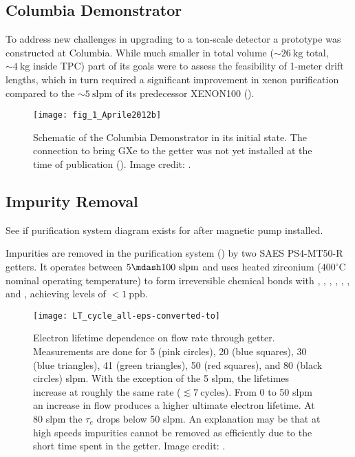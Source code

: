 \subsection{Columbia Demonstrator}
\label{subsec:electron_lifetime_model_demonstrator}
To address new challenges in upgrading to a ton-scale detector a prototype was constructed at Columbia.  While much smaller in total
volume (${\sim}26\ \mathrm{kg}$ total, ${\sim}4\ \mathrm{kg}$ inside TPC) part of its goals were to assess the feasibility of 1-meter
drift lengths, which in turn required a significant improvement in xenon purification compared to the ${\sim}5\ \mathrm{slpm}$ of its
predecessor XENON100 ().

\begin{figure}
\centering
\texttt{[image: fig\_1\_Aprile2012b]}
\caption{Schematic of the Columbia Demonstrator in its initial state.  The connection to bring GXe to the getter was not yet installed
at the time of publication ().  Image credit: .}
\label{fig:electron_lifetime_model_demonstrator_schematic}
\end{figure}



\subsection{Impurity Removal}
\label{subsec:electron_lifetime_model_removal}
See if purification system diagram exists for after magnetic pump installed.

Impurities are removed in the purification system () by two SAES PS4-MT50-R getters.  It operates between
$5 \mdash 100\ \mathrm{slpm}$ and uses heated zirconium ($400^{\circ}\mathrm{C}$ nominal operating temperature) to form irreversible
chemical bonds with , , , , , , and , achieving levels of
$< 1\ \mathrm{ppb}$.

\begin{figure}
\centering
\texttt{[image: LT\_cycle\_all-eps-converted-to]}
\caption{Electron lifetime dependence on flow rate through getter.  Measurements are done for 5 (pink circles), 20 (blue squares), 30
(blue
triangles), 41 (green triangles), 50 (red squares), and 80 (black circles) slpm.  With the exception of the 5 slpm, the lifetimes increase
at roughly the same rate ($\lesssim 7\ \mathrm{cycles}$).  From 0 to 50 slpm an increase in flow produces a higher ultimate electron
lifetime.  At 80 slpm the $\tau_e$ drops below 50 slpm.  An explanation may be that at high speeds impurities cannot be removed as
efficiently due to the short time spent in the getter.  Image credit: .}
\label{fig:electron_lifetime_model_removal_demonstrator_circ}
\end{figure}


